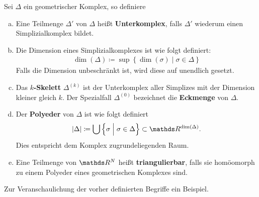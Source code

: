 \begin{Def}
  Sei $\Delta$ ein geometrischer Komplex, so definiere
  \begin{enumerate}[(a)]
  \item Eine Teilmenge $\Delta'$ von $\Delta$ heißt
    \textbf{Unterkomplex}, falls $\Delta'$ wiederum einen
    Simplizialkomplex bildet.
  \item Die Dimension eines Simplizialkomplexes ist wie folgt
    definiert:
    \begin{gather*}
      \dim(\Delta) \coloneqq \sup \left\{ \dim(\sigma) \; \Big| \;
        \sigma \in \Delta \right\}
    \end{gather*}
    Falls die Dimension unbeschränkt ist, wird diese auf unendlich
    gesetzt.
  \item Das \textbf{$k$-Skelett} $\Delta^{(k)}$ ist der Unterkomplex
    aller Simplizes mit der Dimension kleiner gleich $k$. Der
    Spezialfall $\Delta^{(0)}$ bezeichnet die \textbf{Eckmenge} von
    $\Delta$.
  \item Der \textbf{Polyeder} von $\Delta$ ist wie folgt definiert
    \begin{gather*}
      |\Delta| \coloneqq \bigcup \left\{ \sigma \; \Big| \; \sigma \in
        \Delta \right\} \subset \R^{\dim(\Delta)}.
    \end{gather*}
    Dies entspricht dem Komplex zugrundeliegenden Raum.
  \item Eine Teilmenge von $\R^N$ heißt \textbf{triangulierbar}, falls
    sie homöomorph zu einem Polyeder eines geometrischen Komplexes
    sind.
  \end{enumerate}
\end{Def}

Zur Veranschaulichung der vorher definierten Begriffe ein Beispiel.

